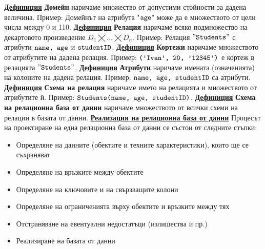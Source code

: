 \documentclass{article}
\newcommand{\sqlplain}[1]{\textcolor{black}{\texttt{#1}}}
\begin{document}
\textbf{\underline{Дефиниция}}
\textbf{Домейн} наричаме множество от допустими стойности за дадена величина. \newline Пример: Домейнът на атрибута "$\sqlplain{age}$" може да е
множеството от цели числа между 0 и 110. \newline\newline
\textbf{\underline{Дефиниция}}
\textbf{Релация} наричаме всяко подмножество на декартовото произведение $D_1 \bigtimes ... \bigtimes D_n$. \newline Пример: Релация $"\sqlplain{Students}"$
с атрибути $\sqlplain{name, age}$ и $\sqlplain{studentID}$. \newline\newline
\textbf{\underline{Дефиниция}}
\textbf{Кортежи} наричаме множеството от атрибутите на дадена релация. \newline Пример: $\sqlplain{('Ivan', 20, '12345')}$ е кортеж в релацията $"\sqlplain{Students}"$. \newline\newline
\textbf{\underline{Дефиниция}}
\textbf{Атрибути} наричаме имената (означенията) на колоните на дадена релация. \newline Пример: $\sqlplain{name, age, studentID}$ са атрибути. \newline\newline
\textbf{\underline{Дефиниция}}
\textbf{Схема на релация} наричаме името на релацията и множеството от атрибутите й. \newline Пример: $\sqlplain{Students(name, age, studentID)}$. \newline\newline
\textbf{\underline{Дефиниция}}
\textbf{Схема на релационна база от данни} наричаме множеството от всички схеми на релации в базата от данни. \newline\newline
\textbf{\underline{Реализация на релационна база от данни}} \newline\newline
Процесът на проектиране на една релационна база от данни се състои от следните стъпки:
\begin{itemize}
    \item Определяне на данните (обектите и техните характеристики), които ще се съхраняват
    \item Определяне на връзките между обектите
    \item Определяне на ключовите и на свързващите колони
    \item Определяне на ограниченията върху обектите и връзките между тях
    \item Отстраняване на евентуални недостатъци (излишества и пр.)
    \item Реализиране на базата от данни
\end{itemize}
\end{document}
